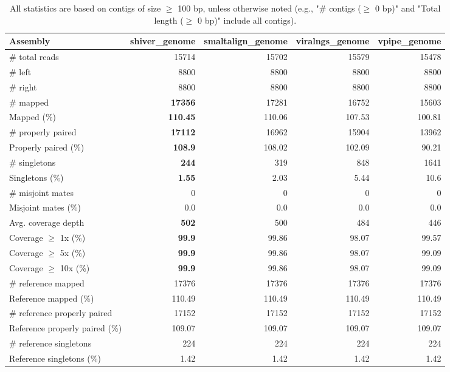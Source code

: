 \documentclass[12pt,a4paper]{article}
\begin{document}
\begin{table}[ht]
\begin{center}
\caption{All statistics are based on contigs of size $\geq$ 100 bp, unless otherwise noted (e.g., "\# contigs ($\geq$ 0 bp)" and "Total length ($\geq$ 0 bp)" include all contigs).}
\begin{tabular}{|l*{4}{|r}|}
\hline
Assembly & shiver\_genome & smaltalign\_genome & viralngs\_genome & vpipe\_genome \\ \hline
\# total reads & 15714 & 15702 & 15579 & 15478 \\ \hline
\# left & 8800 & 8800 & 8800 & 8800 \\ \hline
\# right & 8800 & 8800 & 8800 & 8800 \\ \hline
\# mapped & {\bf 17356} & 17281 & 16752 & 15603 \\ \hline
Mapped (\%) & {\bf 110.45} & 110.06 & 107.53 & 100.81 \\ \hline
\# properly paired & {\bf 17112} & 16962 & 15904 & 13962 \\ \hline
Properly paired (\%) & {\bf 108.9} & 108.02 & 102.09 & 90.21 \\ \hline
\# singletons & {\bf 244} & 319 & 848 & 1641 \\ \hline
Singletons (\%) & {\bf 1.55} & 2.03 & 5.44 & 10.6 \\ \hline
\# misjoint mates & 0 & 0 & 0 & 0 \\ \hline
Misjoint mates (\%) & 0.0 & 0.0 & 0.0 & 0.0 \\ \hline
Avg. coverage depth & {\bf 502} & 500 & 484 & 446 \\ \hline
Coverage $\geq$ 1x (\%) & {\bf 99.9} & 99.86 & 98.07 & 99.57 \\ \hline
Coverage $\geq$ 5x (\%) & {\bf 99.9} & 99.86 & 98.07 & 99.09 \\ \hline
Coverage $\geq$ 10x (\%) & {\bf 99.9} & 99.86 & 98.07 & 99.09 \\ \hline
\# reference mapped & 17376 & 17376 & 17376 & 17376 \\ \hline
Reference mapped (\%) & 110.49 & 110.49 & 110.49 & 110.49 \\ \hline
\# reference properly paired & 17152 & 17152 & 17152 & 17152 \\ \hline
Reference properly paired (\%) & 109.07 & 109.07 & 109.07 & 109.07 \\ \hline
\# reference singletons & 224 & 224 & 224 & 224 \\ \hline
Reference singletons (\%) & 1.42 & 1.42 & 1.42 & 1.42 \\ \hline

\end{tabular}
\end{center}
\end{table}
\end{document}
